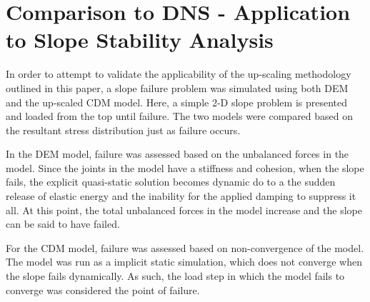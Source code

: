 \section{Comparison to DNS - Application to Slope Stability Analysis}

In order to attempt to validate the applicability of the up-scaling methodology outlined in this paper, a slope failure problem was simulated using both DEM and the up-scaled CDM model. Here, a simple 2-D slope problem is presented and loaded from the top until failure. The two models were compared based on the resultant stress distribution just as failure occurs. 

In the DEM model, failure was assessed based on the unbalanced forces in the model. Since the joints in the model have a stiffness and cohesion, when the slope fails, the explicit quasi-static solution becomes dynamic do to a the sudden release of elastic energy and the inability for the applied damping to suppress it all. At this point, the total unbalanced forces in the model increase and the slope can be said to have failed. 

For the CDM model, failure was assessed based on non-convergence of the model. The model was run as a implicit static simulation, which does not converge when the slope fails dynamically. As such, the load step in which the model fails to converge was considered the point of failure.
